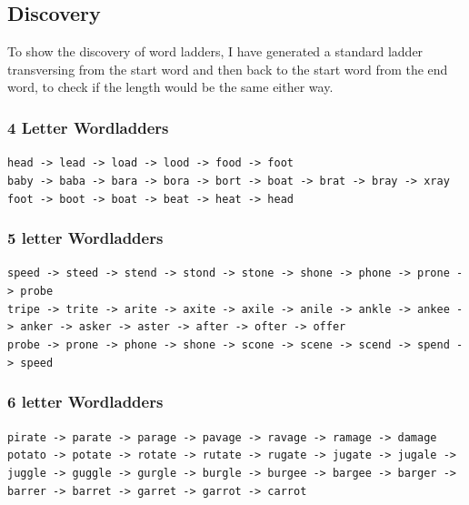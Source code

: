 \documentclass[10pt, a4paper]{article}
\begin{document}
\subsection{Discovery}

To show the discovery of word ladders, I have generated a standard ladder transversing from the start word and then back to the start word from the end word, to check if the length would be the same either way.

\subsubsection{4 Letter Wordladders}
\hspace*{0.15in}
\texttt{head -> lead -> load -> lood -> food -> foot}\\

\texttt{baby -> baba -> bara -> bora -> bort -> boat -> brat -> bray -> xray}\\

\texttt{foot -> boot -> boat -> beat -> heat -> head}\\

\subsubsection{5 letter Wordladders}
\hspace*{0.15in}
\texttt{speed -> steed -> stend -> stond -> stone -> shone -> phone -> prone -> probe}\\

\texttt{tripe -> trite -> arite -> axite -> axile -> anile -> ankle -> ankee -> anker -> asker -> aster -> after -> ofter -> offer}\\

\texttt{probe -> prone -> phone -> shone -> scone -> scene -> scend -> spend -> speed}\\


\subsubsection{6 letter Wordladders}	
\hspace*{0.15in}
\texttt{pirate -> parate -> parage -> pavage -> ravage -> ramage -> damage}\\

\texttt{potato -> potate -> rotate -> rutate -> rugate -> jugate -> jugale -> juggle -> guggle -> gurgle -> burgle -> burgee -> bargee -> barger -> barrer -> barret -> garret -> garrot -> carrot}\\
\end{document}
